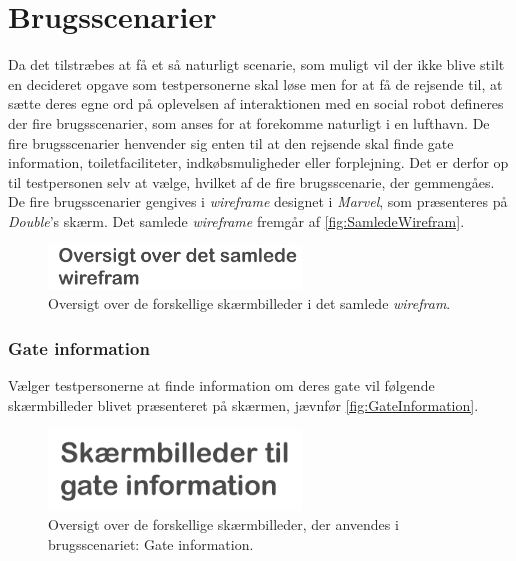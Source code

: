 \section{Brugsscenarier}
\label{ParametreBrugsscenarier}
%
Da det tilstræbes at få et så naturligt scenarie, som muligt vil der ikke blive stilt en decideret opgave som testpersonerne skal løse men for at få de rejsende til, at sætte deres egne ord på oplevelsen af interaktionen med en social robot defineres der fire brugsscenarier, som anses for at forekomme naturligt i en lufthavn. De fire brugsscenarier henvender sig enten til at den rejsende skal finde gate information, toiletfaciliteter, indkøbsmuligheder eller forplejning. Det er derfor op til testpersonen selv at vælge, hvilket af de fire brugsscenarie, der gemmengåes. De fire brugsscenarier gengives i \textit{wireframe} designet i \textit{Marvel}, som præsenteres på \textit{Double}'s skærm. Det samlede \textit{wireframe} fremgår af \autoref{fig:SamledeWirefram}.
%
\begin{figure}[H]
\centering
\includegraphics[width = 0.6\textwidth]{Figure/SamledeWirefram} 
\caption{Oversigt over de forskellige skærmbilleder i det samlede \textit{wirefram}.}
\label{fig:SamledeWirefram}
\end{figure}
\noindent
%  

\subsubsection*{Gate information}
%
Vælger testpersonerne at finde information om deres gate vil følgende skærmbilleder blivet præsenteret på skærmen, jævnfør \autoref{fig:GateInformation}. 
%
\begin{figure}[H]
\centering
\includegraphics[width = 0.6\textwidth]{Figure/GateInformation} 
\caption{Oversigt over de forskellige skærmbilleder, der anvendes i brugsscenariet: Gate information.}
\label{fig:GateInformation}
\end{figure}
\noindent
%  

